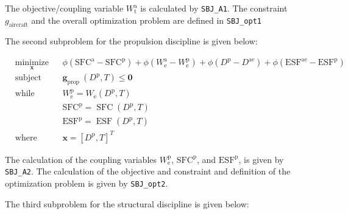 \documentclass[11pt]{article}
\begin{document}
The objective/coupling variable \(W_{\mathrm{t}}^{\mathrm{a}}\) is
calculated by \texttt{SBJ\_A1}. The constraint \(g_{\mathrm{aircraft}}\)
and the overall optimization problem are defined in \texttt{SBJ\_opt1}

The second subproblem for the propulsion discipline is given below:

\begin{equation*}
    \begin{aligned}
        & \underset{\mathbf{x}}{\text{minimize}}
        & & \phi\left(\mathrm{SFC}^{\mathrm{a}}-\mathrm{SFC}^{\mathrm{p}}\right)+\phi\left(W_{\mathrm{e}}^{\mathrm{a}}-W_{\mathrm{e}}^{\mathrm{p}}\right)+\phi\left(D^{\mathrm{p}}-D^{\mathrm{ae}}\right)+\phi\left(\mathrm{ESF}^{\mathrm{ae}}-\mathrm{ESF}^{\mathrm{p}}\right) \\
    & \text{subject to}
        & & \mathbf{g}_{\text {prop }}\left(D^{\mathrm{p}}, T\right) \leq \mathbf{0} \\
    & \text{while solving}
        & & W_{\mathrm{e}}^{\mathrm{p}}=W_{\mathrm{e}}\left(D^{\mathrm{p}}, T\right) \\
    & & & \mathrm{SFC}^{\mathrm{p}}=\operatorname{SFC}\left(D^{\mathrm{p}}, T\right) \\
    & & & \mathrm{ESF}^{\mathrm{p}}=\operatorname{ESF}\left(D^{\mathrm{p}}, T\right) \\
    & \text{where}
        & & \mathbf{x} = \left[D^{\mathrm{p}}, T\right]^\textit{T}
    \end{aligned}
\end{equation*}

The calculation of the coupling variables
\(W_{\mathrm{e}}^{\mathrm{p}}\), \(\mathrm{SFC}^{\mathrm{p}}\), and
\(\mathrm{ESF}^{\mathrm{p}}\), is given by \texttt{SBJ\_A2}. The
calculation of the objective and constraint and definition of the
optimization problem is given by \texttt{SBJ\_opt2}.

The third subproblem for the structural discipline is given below:
\end{document}
